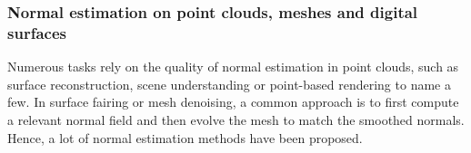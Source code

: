 


\subsubsection{Normal estimation on point clouds, meshes and digital surfaces}
\label{sec:estim:all}


Numerous tasks rely on the quality of normal estimation in point clouds, such as
surface reconstruction, scene understanding or point-based rendering to name a few.
In surface fairing or mesh denoising, a common approach is to first compute a relevant
normal field and then evolve the mesh to match the smoothed normals.
Hence, a lot of normal estimation methods have been proposed. 

